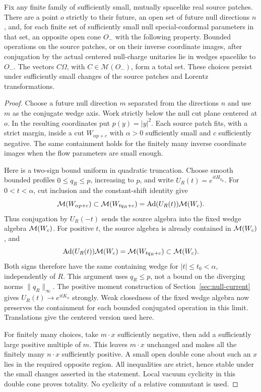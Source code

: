 \begin{lemma}
\label{P:common-wedge}
Fix any finite family of sufficiently small, mutually spacelike real
source patches.  There are a point $o$ strictly to their future, an open set of
future null directions $n$, and, for each finite set of sufficiently small
null special-conformal parameters in that set, an opposite open cone
$O_-$ with the following property.  Bounded operations on the source
patches, or on their inverse coordinate images, after conjugation by the
actual centered null-charge unitaries lie in wedges spacelike to $O_-$.
The vectors $C\Omega$, with $C\in\mathcal M(O_-)$, form a total set.
These choices persist under sufficiently small changes of the source
patches and Lorentz transformations.
\end{lemma}

\begin{proof}
Choose a future null direction $m$ separated from the directions $n$ and
use $m$ as the conjugate wedge axis.  Work strictly below the null cut
plane centered at $o$.  In the resulting coordinates put $p(y)=|y|^2$.
Each source patch fits, with a strict margin, inside a cut
$W_{\alpha p+c}$ with $\alpha>0$ sufficiently small and $c$ sufficiently
negative.  The same containment holds for the finitely many inverse
coordinate images when the flow parameters are small enough.

Here is a two-sign bound uniform in quadratic truncation.  Choose smooth
bounded profiles $0\leq q_R\leq p$, increasing to $p$, and write
$U_R(t)=e^{itH_{q_R}}$.  For $0<t<\alpha$, cut inclusion and the
constant-shift identity give
\[
 \mathcal M(W_{\alpha p+c})\subset\mathcal M(W_{tq_R+c})
       =\operatorname{Ad}(U_R(t))\mathcal M(W_c).
\]
Thus conjugation by $U_R(-t)$ sends the source algebra into the fixed
wedge algebra $\mathcal M(W_c)$.  For positive $t$, the source algebra is
already contained in $\mathcal M(W_c)$, and
\[
 \operatorname{Ad}(U_R(t))\mathcal M(W_c)=\mathcal M(W_{tq_R+c})\subset\mathcal M(W_c).
\]
Both signs therefore have the same containing wedge for
$|t|\leq t_0<\alpha$, independently of $R$.  This argument uses
$q_R\leq p$, not a bound on the diverging norms $\|q_R\|_\infty$.
The positive moment construction of Section~\ref{sec:null-current}
gives $U_R(t)\to e^{itK_n}$ strongly.  Weak closedness of the fixed
wedge algebra now preserves the containment for each bounded conjugated
operation in this limit.  Translations give the centered version used
here.

For finitely many choices, take $m\cdot x$ sufficiently negative, then
add a sufficiently large positive multiple of $m$.  This leaves
$m\cdot x$ unchanged and makes all the finitely many $n\cdot x$
sufficiently positive.  A small open double cone about such an $x$ lies
in the required opposite region.  All inequalities are strict, hence
stable under the small changes asserted in the statement.  Local
vacuum cyclicity in this double cone proves totality.  No cyclicity of a
relative commutant is used.
\end{proof}

